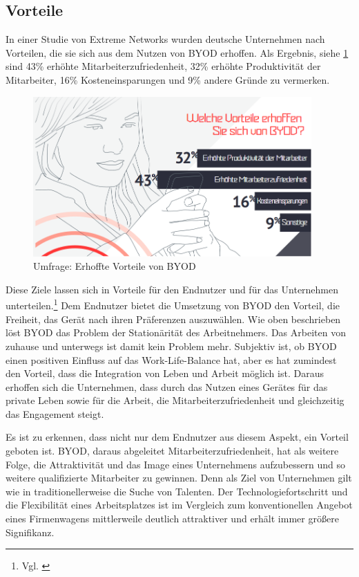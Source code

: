 \subsection{Vorteile}
In einer Studie von Extreme Networks \cite{ext2014} wurden deutsche Unternehmen nach Vorteilen, die sie sich aus dem Nutzen von BYOD erhoffen. Als Ergebnis, siehe \cref{fig:VorBYOD} sind 43\% erhöhte Mitarbeiterzufriedenheit, 32\% erhöhte Produktivität der Mitarbeiter, 16\% Kosteneinsparungen und 9\% andere Gründe zu vermerken.
\begin{figure}[hbt]
\centering
\includegraphics[width=0.95\textwidth]{Bilder/Vorteile_BYOD.png} 
\caption{Umfrage: Erhoffte Vorteile von BYOD}\label{fig:VorBYOD}
\end{figure}
Diese Ziele lassen sich in Vorteile für den Endnutzer und für das Unternehmen unterteilen.\footnote{Vgl. \cite{fuj2018} } Dem Endnutzer bietet die Umsetzung von BYOD den Vorteil, die Freiheit, das Gerät nach ihren Präferenzen auszuwählen. Wie oben beschrieben löst BYOD das Problem der Stationärität des Arbeitnehmers. Das Arbeiten von zuhause und unterwegs ist damit kein Problem mehr. Subjektiv ist, ob BYOD einen positiven Einfluss auf das Work-Life-Balance hat, aber es hat zumindest den Vorteil, dass die Integration von Leben und Arbeit möglich ist. Daraus erhoffen sich die Unternehmen, dass durch das Nutzen eines Gerätes für das private Leben sowie für die Arbeit, die Mitarbeiterzufriedenheit und gleichzeitig das Engagement steigt.

Es ist zu erkennen, dass nicht nur dem Endnutzer aus diesem Aspekt, ein Vorteil geboten ist. BYOD, daraus abgeleitet Mitarbeiterzufriedenheit, hat als weitere Folge, die Attraktivität und das Image eines Unternehmens aufzubessern und so weitere qualifizierte Mitarbeiter zu gewinnen. Denn als Ziel von Unternehmen gilt wie in traditionellerweise die Suche von Talenten. Der Technologiefortschritt und die Flexibilität eines Arbeitsplatzes ist im Vergleich zum konventionellen Angebot eines Firmenwagens mittlerweile deutlich attraktiver und erhält immer größere Signifikanz. 

